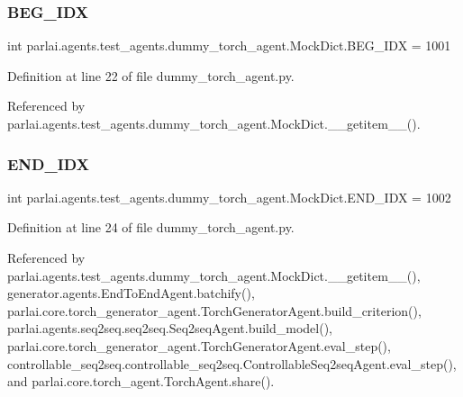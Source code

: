 \subsubsection{\texorpdfstring{B\+E\+G\+\_\+\+I\+DX}{BEG\_IDX}}
{\footnotesize\ttfamily int parlai.\+agents.\+test\+\_\+agents.\+dummy\+\_\+torch\+\_\+agent.\+Mock\+Dict.\+B\+E\+G\+\_\+\+I\+DX = 1001\hspace{0.3cm}{\ttfamily [static]}}



Definition at line 22 of file dummy\+\_\+torch\+\_\+agent.\+py.



Referenced by parlai.\+agents.\+test\+\_\+agents.\+dummy\+\_\+torch\+\_\+agent.\+Mock\+Dict.\+\_\+\+\_\+getitem\+\_\+\+\_\+().

\mbox{\label{classparlai_1_1agents_1_1test__agents_1_1dummy__torch__agent_1_1MockDict_ae67922b8eddea3a8f5262f93a9b9be70}} 
\subsubsection{\texorpdfstring{E\+N\+D\+\_\+\+I\+DX}{END\_IDX}}
{\footnotesize\ttfamily int parlai.\+agents.\+test\+\_\+agents.\+dummy\+\_\+torch\+\_\+agent.\+Mock\+Dict.\+E\+N\+D\+\_\+\+I\+DX = 1002\hspace{0.3cm}{\ttfamily [static]}}



Definition at line 24 of file dummy\+\_\+torch\+\_\+agent.\+py.



Referenced by parlai.\+agents.\+test\+\_\+agents.\+dummy\+\_\+torch\+\_\+agent.\+Mock\+Dict.\+\_\+\+\_\+getitem\+\_\+\+\_\+(), generator.\+agents.\+End\+To\+End\+Agent.\+batchify(), parlai.\+core.\+torch\+\_\+generator\+\_\+agent.\+Torch\+Generator\+Agent.\+build\+\_\+criterion(), parlai.\+agents.\+seq2seq.\+seq2seq.\+Seq2seq\+Agent.\+build\+\_\+model(), parlai.\+core.\+torch\+\_\+generator\+\_\+agent.\+Torch\+Generator\+Agent.\+eval\+\_\+step(), controllable\+\_\+seq2seq.\+controllable\+\_\+seq2seq.\+Controllable\+Seq2seq\+Agent.\+eval\+\_\+step(), and parlai.\+core.\+torch\+\_\+agent.\+Torch\+Agent.\+share().

